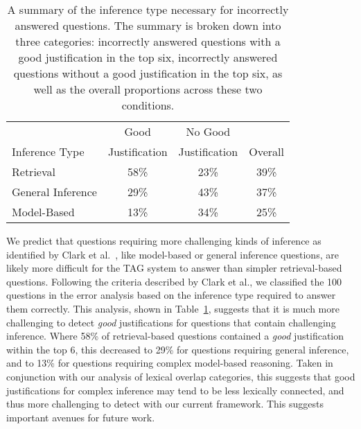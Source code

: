 %
%
\begin{table}[t]

\caption{{  A summary of the inference type necessary for incorrectly answered questions.  The summary is broken down into three categories: incorrectly answered questions with a good justification in the top six, incorrectly answered questions without a good justification in the top six, as well as the overall proportions across these two conditions. }} 
\small
\begin{center}
\begin{tabular}{lccc}

\hline
\multicolumn{1}{c}{} & \multicolumn{1}{c}{Good} &\multicolumn{1}{c}{No Good} & \multicolumn{1}{c}{}  \\
\multicolumn{1}{l}{Inference Type} & \multicolumn{1}{c}{Justification} &\multicolumn{1}{c}{Justification} & \multicolumn{1}{c}{Overall}  \\

\hline
Retrieval 			& 58\%		&	23\%		& 39\%	\\
General Inference	& 29\%		&	43\%		& 37\%	\\
Model-Based			& 13\%		&	34\%		& 25\%	\\
\hline
\end{tabular}
\label{tab:knowledgetype}
\end{center}
\end{table}

{}
We predict that questions requiring more challenging kinds of inference as identified by Clark et al.~, like model-based or general inference questions, are likely more difficult for the TAG system to answer than simpler retrieval-based questions. 
Following the criteria described by Clark et al., we classified the 100 questions in the error analysis based on the inference type required to answer them correctly. 
This analysis, shown in Table~\ref{tab:knowledgetype}, suggests that it is much more challenging to detect \emph{good} justifications for questions that contain challenging inference.  Where 58\% of retrieval-based questions contained a \emph{good} justification within the top 6, this decreased to 29\% for questions requiring general inference, and to 13\% for questions requiring complex model-based reasoning.  Taken in conjunction with our analysis of lexical overlap categories, this suggests that good justifications for complex inference may tend to be less lexically connected, and thus more challenging to detect with our current framework. This suggests important avenues for future work.

